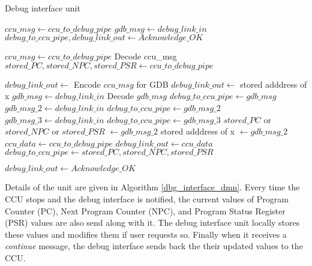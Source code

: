\begin{algorithm}
	\caption{Debug interface unit}\label{dbg_interface_dmn}
	\begin{algorithmic}[1]
	\State $ccu\_msg \gets ccu\_to\_debug\_pipe$
	\State $gdb\_msg\gets debug\_link\_in$		
	\EndWhile\label{dummy}
	\State $debug\_to\_ccu\_pipe, debug\_link\_out \gets Acknowledge\_OK$
	
		\State $ccu\_msg \gets ccu\_to\_debug\_pipe$ 
		\State Decode ccu\_msg
				\State $stored\_PC, stored\_NPC, stored\_PSR \gets ccu\_to\_debug\_pipe$
			\EndIf
	
		\State $debug\_link\_out \gets $ Encode $ccu\_msg$ for GDB
				\State $debug\_link\_out \gets $ stored adddress of x
			\EndIf
		\EndIf	
		\State $gdb\_msg \gets debug\_link\_in$	
			\State Decode $gdb\_msg$
			\State $debug\_to\_ccu\_pipe \gets gdb\_msg$
				\State $gdb\_msg\_2 \gets debug\_link\_in$	
				\State $debug\_to\_ccu\_pipe \gets  gdb\_msg\_2$
			\EndIf
				\State $gdb\_msg\_3 \gets debug\_link\_in$	
				\State $debug\_to\_ccu\_pipe \gets  gdb\_msg\_3$
			\EndIf	
				\State $stored\_PC$ or $stored\_NPC$ or $stored\_PSR$ $\gets gdb\_msg\_2$
				\State stored adddress of x $\gets gdb\_msg\_2$
				\State $ccu\_data \gets ccu\_to\_debug\_pipe$
				\State $debug\_link\_out \gets ccu\_data$
				\State $debug\_to\_ccu\_pipe \gets stored\_PC, stored\_NPC, stored\_PSR$
			\EndIf
	
				\State $debug\_link\_out \gets Acknowledge\_OK$
			\EndIf
		\EndIf
	\EndWhile
	\EndFunction
\end{algorithmic}
\end{algorithm}

 Details of the unit are given in Algorithm \ref{dbg_interface_dmn}. Every time the CCU stops and the debug interface is notified, the current values of Program Counter (PC), Next Program Counter (NPC), and Program Status Register (PSR) values are also send along with it. The debug interface unit locally stores these values and modifies them if user requests so. Finally when it receives a \textit{continue} message, the debug interface sends back the their updated values to the CCU.
 
